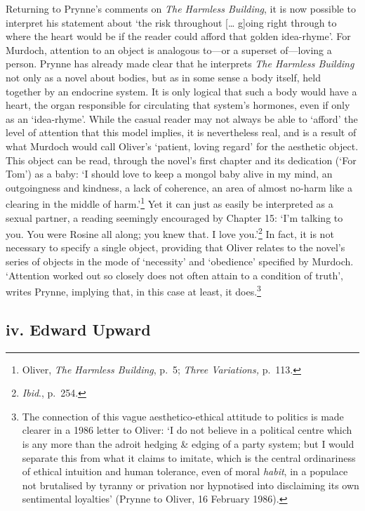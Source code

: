 \documentclass[]{article}
\begin{document}
Returning to Prynne's comments on \emph{The Harmless Building}, it is
now possible to interpret his statement about `the risk throughout
{[}\ldots{} g{]}oing right through to where the heart would be if the
reader could afford that golden idea-rhyme'. For Murdoch, attention to
an object is analogous to---or a superset of---loving a person. Prynne
has already made clear that he interprets \emph{The Harmless Building}
not only as a novel about bodies, but as in some sense a body itself,
held together by an endocrine system. It is only logical that such a
body would have a heart, the organ responsible for circulating that
system's hormones, even if only as an `idea-rhyme'. While the casual
reader may not always be able to `afford' the level of attention that
this model implies, it is nevertheless real, and is a result of what
Murdoch would call Oliver's `patient, loving regard' for the aesthetic
object. This object can be read, through the novel's first chapter and
its dedication (`For Tom') as a baby: `I should love to keep a mongol
baby alive in my mind, an outgoingness and kindness, a lack of
coherence, an area of almost no-harm like a clearing in the middle of
harm.'\footnote{Oliver, \emph{The Harmless Building}, p.~5; \emph{Three
  Variations,} p.~113.} Yet it can just as easily be interpreted as a
sexual partner, a reading seemingly encouraged by Chapter 15: `I'm
talking to you. You were Rosine all along; you knew that. I love
you.'\footnote{\emph{Ibid}., p.~254.} In fact, it is not necessary to
specify a single object, providing that Oliver relates to the novel's
series of objects in the mode of `necessity' and `obedience' specified
by Murdoch. `Attention worked out so closely does not often attain to a
condition of truth', writes Prynne, implying that, in this case at
least, it does.\footnote{The connection of this vague aesthetico-ethical
  attitude to politics is made clearer in a 1986 letter to Oliver: `I do
  not believe in a political centre which is any more than the adroit
  hedging \& edging of a party system; but I would separate this from
  what it claims to imitate, which is the central ordinariness of
  ethical intuition and human tolerance, even of moral \emph{habit}, in
  a populace not brutalised by tyranny or privation nor hypnotised into
  disclaiming its own sentimental loyalties' (Prynne to Oliver, 16
  February 1986).}

\subsection{iv. Edward Upward}\label{iv.-edward-upward}
\end{document}
